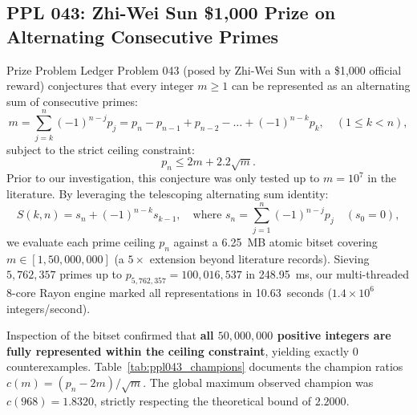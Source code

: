 \documentclass[11pt,a4paper]{article}
\theoremstyle{definition}
\theoremstyle{remark}
\begin{document}
\subsection{PPL 043: Zhi-Wei Sun \$1,000 Prize on Alternating Consecutive Primes}
Prize Problem Ledger Problem 043 (posed by Zhi-Wei Sun with a \$1,000 official reward) conjectures that every integer $m \ge 1$ can be represented as an alternating sum of consecutive primes:
\begin{equation}
m = \sum_{j=k}^n (-1)^{n-j} p_j = p_n - p_{n-1} + p_{n-2} - \dots + (-1)^{n-k} p_k, \quad (1 \le k < n),
\end{equation}
subject to the strict ceiling constraint:
\begin{equation}
p_n \le 2m + 2.2\sqrt{m}.
\end{equation}
Prior to our investigation, this conjecture was only tested up to $m = 10^7$ in the literature. By leveraging the telescoping alternating sum identity:
\begin{equation}
S(k, n) = s_n + (-1)^{n-k} s_{k-1}, \quad \text{where } s_n = \sum_{j=1}^n (-1)^{n-j} p_j \quad (s_0 = 0),
\end{equation}
we evaluate each prime ceiling $p_n$ against a 6.25~MB atomic bitset covering $m \in [1, 50,000,000]$ (a $5\times$ extension beyond literature records). Sieving $5,762,357$ primes up to $p_{5,762,357} = 100,016,537$ in 248.95~ms, our multi-threaded 8-core Rayon engine marked all representations in 10.63~seconds ($1.4 \times 10^6$ integers/second).

Inspection of the bitset confirmed that \textbf{all $50,000,000$ positive integers are fully represented within the ceiling constraint}, yielding exactly $0$ counterexamples. Table~\ref{tab:ppl043_champions} documents the champion ratios $c(m) = (p_n - 2m) / \sqrt{m}$. The global maximum observed champion was $c(968) = 1.8320$, strictly respecting the theoretical bound of $2.2000$.
\end{document}
